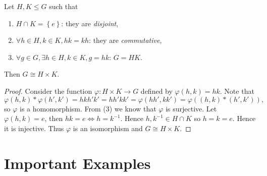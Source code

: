 \documentclass[10pt]{article}
\def\le{\leqslant}
\begin{document}
    \begin{theorem}\label{thm:Direct Product Theorem}
        Let $ H,K\le G $ such that
        \begin{enumerate}[(1)]
            \item $ H \cap K=\left\{ e\right\} $: they are \textit{disjoint},
            \item $ \forall h\in H,k\in K, hk=kh $: they are \textit{commutative},
            \item $ \forall g\in G, \exists h\in H, k\in K, g=hk $: $ G=HK $.
        \end{enumerate}
        Then $ G \cong H \times K $.
    \end{theorem}
    \begin{proof}
        Consider the function $ \varphi: H\times K \to G $ defined by $ \varphi(h,k)=hk $. Note that 
        \[
            \varphi(h,k) * \varphi(h',k') = hkh'k'=hh'kk'=\varphi(hh',kk')=\varphi((h,k)*(h',k'))
        ,\]
        so $ \varphi $ is a homomorphism. From (3) we know that $ \varphi $ is surjective. Let $ \varphi(h,k)=e $, then $ hk=e \Leftrightarrow h=k^{-1} $. Hence $ h,k^{-1}\in H \cap K $ so $ h=k=e $. Hence it is injective. Thus $\varphi$ is an isomorphism and $ G \cong H \times K $.
    \end{proof}
    \section{Important Examples}
\end{document}

